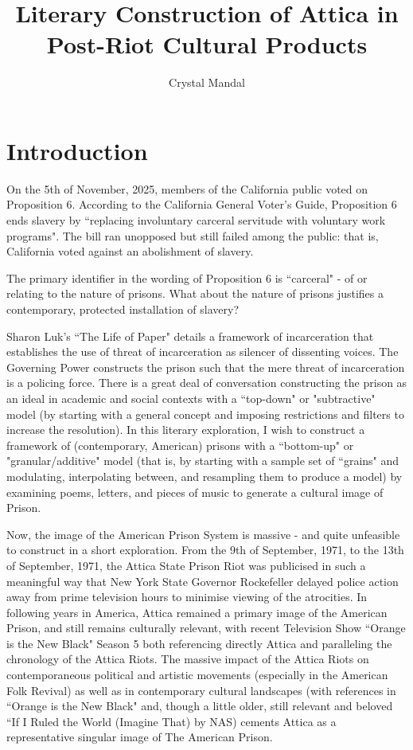 \documentclass[14pt, letterpaper]{report}
\title{ \vspace*{-72pt} Literary Construction of Attica in Post-Riot Cultural Products }
\author{Crystal Mandal}
\date{}
\begin{document}
\maketitle

\section*{Introduction}

	On the 5th of November, 2025, members of the California 
	public voted on Proposition 6. According to the California 
	General Voter's Guide, Proposition 6 ends slavery by 
	``replacing involuntary carceral servitude  with voluntary work 
	programs". The bill ran unopposed but still failed among the 
	public: that is, California voted against an abolishment of 
        slavery.
	
	The primary identifier in the wording of Proposition 
	6 is ``carceral" - of or relating to the nature of prisons. 
	What about the nature of prisons justifies a contemporary,
	protected installation of slavery?
	
	Sharon Luk's ``The Life of Paper" details a framework of 
	incarceration that establishes the use of threat of incarceration 
	as silencer of dissenting voices. The Governing Power constructs 
	the prison such that the mere threat of incarceration is a 
	policing force. There is a great deal of conversation constructing 
	the prison as an ideal in academic and social contexts with a 
	``top-down" or "subtractive" model (by starting with a general 
	concept and imposing restrictions and filters to increase the 
	resolution). In this literary exploration, I wish to construct a 
	framework of (contemporary, American) prisons with a ``bottom-up" 
	or "granular/additive" model (that is, by starting with a sample 
	set of ``grains" and modulating, interpolating between, and 
	resampling them to produce a model) by examining poems, letters, 
	and pieces of music to generate a cultural image of Prison.
	
	Now, the image of the American Prison System is massive - 
	and quite unfeasible to construct in a short exploration. From 
	the 9th of September, 1971, to the 13th of September, 1971, the 
	Attica State Prison Riot was publicised in such a meaningful way 
	that New York State Governor Rockefeller delayed police action away 
	from prime television hours to minimise viewing of the atrocities. 
	In following years in America, Attica remained a primary image of 
	the American Prison, and still remains culturally relevant, with 
	recent Television Show ``Orange is the New Black" Season 5 both 
	referencing directly Attica and paralleling the chronology of the 
	Attica Riots. The massive impact of the Attica Riots on contemporaneous 
	political and artistic movements (especially in the American Folk 
	Revival) as well as in contemporary cultural landscapes (with references 
	in ``Orange is the New Black" and, though a little older, still 
	relevant and beloved ``If I Ruled the World (Imagine That) by NAS) 
	cements Attica as a representative singular image of The American 
	Prison. 
	
\end{document}
